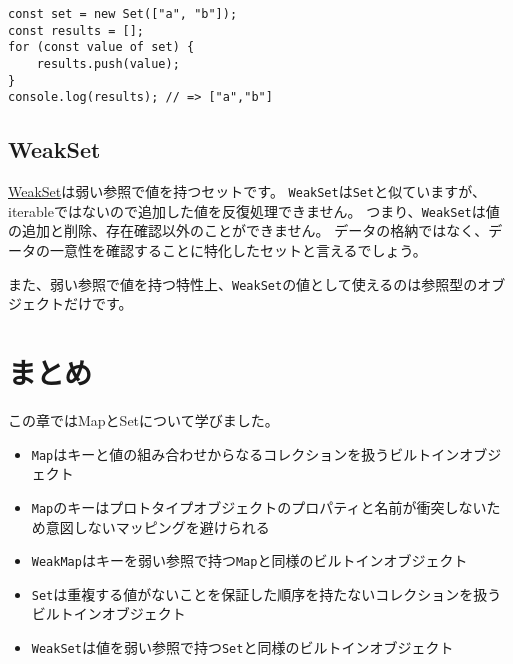 \begin{lstlisting}
const set = new Set(["a", "b"]);
const results = [];
for (const value of set) {
    results.push(value);
}
console.log(results); // => ["a","b"]
\end{lstlisting}

\hypertarget{weakset}{%
\subsection{WeakSet}\label{weakset}}

\href{https://developer.mozilla.org/ja/docs/Web/JavaScript/Reference/Global_Objects/WeakSet}{WeakSet}は弱い参照で値を持つセットです。
\texttt{WeakSet}は\texttt{Set}と似ていますが、iterableではないので追加した値を反復処理できません。
つまり、\texttt{WeakSet}は値の追加と削除、存在確認以外のことができません。
データの格納ではなく、データの一意性を確認することに特化したセットと言えるでしょう。

また、弱い参照で値を持つ特性上、\texttt{WeakSet}の値として使えるのは参照型のオブジェクトだけです。

\hypertarget{conclusion}{%
\section{まとめ}\label{conclusion}}

この章ではMapとSetについて学びました。

\begin{itemize}
\item
  \texttt{Map}はキーと値の組み合わせからなるコレクションを扱うビルトインオブジェクト
\item
  \texttt{Map}のキーはプロトタイプオブジェクトのプロパティと名前が衝突しないため意図しないマッピングを避けられる
\item
  \texttt{WeakMap}はキーを弱い参照で持つ\texttt{Map}と同様のビルトインオブジェクト
\item
  \texttt{Set}は重複する値がないことを保証した順序を持たないコレクションを扱うビルトインオブジェクト
\item
  \texttt{WeakSet}は値を弱い参照で持つ\texttt{Set}と同様のビルトインオブジェクト
\end{itemize}
